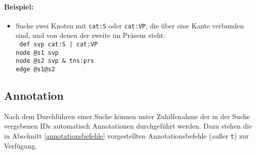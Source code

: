 \documentclass[12pt]{scrartcl}
\begin{document}
{\paragraph*{Beispiel:}
\begin{itemize}
	\item Suche zwei Knoten mit \texttt{cat:S} oder \texttt{cat:VP}, die über eine Kante verbunden sind, und von denen der zweite im Präsens steht:\\
	{\tt
	def svp cat:S | cat:VP\\[-.4ex]
	node @s1 svp\\[-.4ex]
	node @s2 svp \& tns:prs\\[-.4ex]
	edge @s1@s2\\[-.4ex]
	}
\end{itemize}



\subsection{Annotation}

Nach dem Durchführen einer Suche können unter Zuhilfenahme der in der Suche vergebenen IDs automatisch Annotationen durchgeführt werden. Dazu stehen die in Abschnitt \ref{annotationsbefehle} vorgestellten Annotationsbefehle (außer \texttt{t}) zur Verfügung.

}
\end{document}
